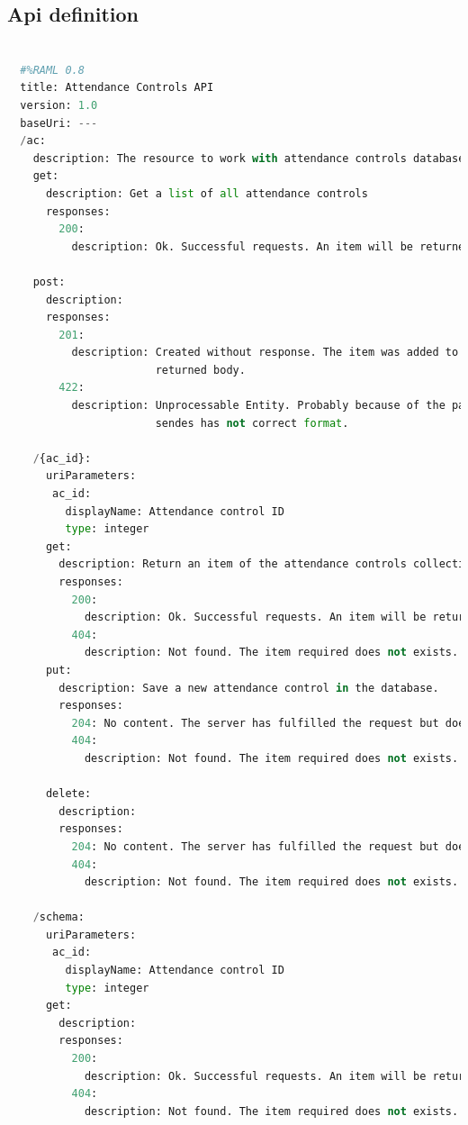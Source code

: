 \subsection{Api definition}
\begin{lstlisting}[language=python,frame=none]

  #%RAML 0.8
  title: Attendance Controls API
  version: 1.0
  baseUri: ---
  /ac:
    description: The resource to work with attendance controls database saved-
    get:
      description: Get a list of all attendance controls
      responses:
        200:
          description: Ok. Successful requests. An item will be returned.

    post:
      description:
      responses:
        201:
          description: Created without response. The item was added to database will not
                       returned body.
        422:
          description: Unprocessable Entity. Probably because of the payload
                       sendes has not correct format.

    /{ac_id}:
      uriParameters:
       ac_id:
         displayName: Attendance control ID
         type: integer
      get:
        description: Return an item of the attendance controls collection.
        responses:
          200:
            description: Ok. Successful requests. An item will be returned.
          404:
            description: Not found. The item required does not exists.
      put:
        description: Save a new attendance control in the database.
        responses:
          204: No content. The server has fulfilled the request but does not need to return an entity-body.
          404:
            description: Not found. The item required does not exists.

      delete:
        description:
        responses:
          204: No content. The server has fulfilled the request but does not need to return an entity-body.
          404:
            description: Not found. The item required does not exists.

    /schema:
      uriParameters:
       ac_id:
         displayName: Attendance control ID
         type: integer
      get:
        description:
        responses:
          200:
            description: Ok. Successful requests. An item will be returned.
          404:
            description: Not found. The item required does not exists.

\end{lstlisting}




